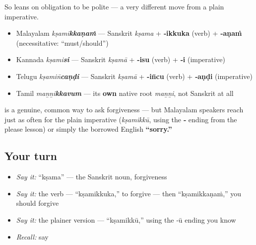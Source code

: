 So \textbf{} leans on obligation to be polite — a very different move from a plain imperative.

\begin{culture}
\begin{itemize}
\raggedright
  \item Malayalam \textbf{} \emph{kṣami\textbf{kkaṇaṁ}} — Sanskrit \emph{kṣama} + \textbf{‑ikkuka} (verb) + \textbf{‑aṇaṁ} (necessitative: \textquotedblleft{}must/should\textquotedblright{})
  \item Kannada \textbf{} \emph{kṣami\textbf{si}} — Sanskrit \emph{kṣamā} + \textbf{‑isu} (verb) + \textbf{‑i} (imperative)
  \item Telugu \textbf{} \emph{kṣamin̄\textbf{caṇḍi}} — Sanskrit \emph{kṣamā} + \textbf{‑in̄cu} (verb) + \textbf{‑aṇḍi} (imperative)
  \item Tamil \textbf{} \emph{maṉṉi\textbf{kkavum}} — its \textbf{own} native root \emph{maṉṉi}, not Sanskrit at all
\end{itemize}
\end{culture}

\begin{culture}
\textbf{} is a genuine, common way to ask forgiveness — but Malayalam speakers reach just as often for the plain imperative \textbf{} (\emph{kṣamikkū}, using the \textbf{‑} ending from the please lesson) or simply the borrowed English \textbf{\textquotedblleft{}sorry.\textquotedblright{}}
\end{culture}

\subsection*{Your turn}
\begin{itemize}
\raggedright
  \item \emph{Say it:} \textquotedblleft{}kṣama\textquotedblright{} — the Sanskrit noun, forgiveness
  \item \emph{Say it:} the verb — \textquotedblleft{}kṣamikkuka,\textquotedblright{} to forgive — then \textquotedblleft{}kṣamikkaṇaṁ,\textquotedblright{} you should forgive
  \item \emph{Say it:} the plainer version — \textquotedblleft{}kṣamikkū,\textquotedblright{} using the ‑ū ending you know
  \item \emph{Recall:} say \textbf{}
\end{itemize}

